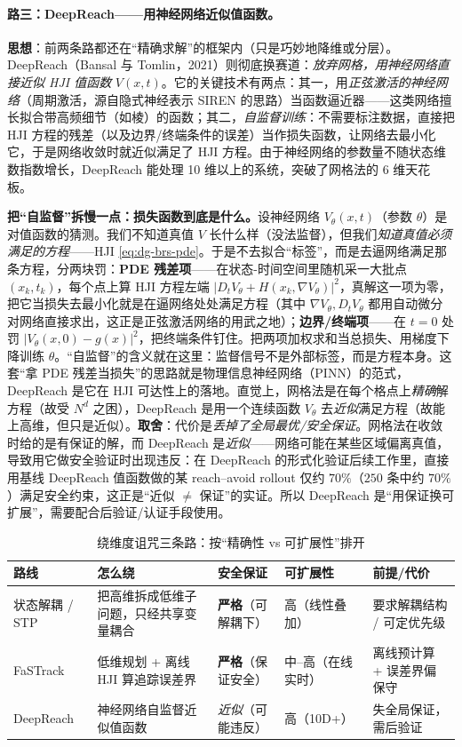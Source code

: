 \paragraph{路三：DeepReach——用神经网络近似值函数。}
\textbf{思想}：前两条路都还在“精确求解”的框架内（只是巧妙地降维或分层）。DeepReach（Bansal 与 Tomlin，2021）则彻底换赛道：\emph{放弃网格，用神经网络直接近似 HJI 值函数} $V(x,t)$\cite{bansal2021deepreach}。它的关键技术有两点：其一，用\emph{正弦激活的神经网络}（周期激活，源自隐式神经表示 SIREN 的思路）当函数逼近器——这类网络擅长拟合带高频细节（如棱）的函数；其二，\emph{自监督训练}：不需要标注数据，直接把 HJI 方程的残差（以及边界/终端条件的误差）当作损失函数，让网络去最小化它，于是网络收敛时就近似满足了 HJI 方程。由于神经网络的参数量不随状态维数指数增长，DeepReach 能处理 10 维以上的系统，突破了网格法的 6 维天花板。

\textbf{把“自监督”拆慢一点：损失函数到底是什么。}\;设神经网络 $V_\theta(x,t)$（参数 $\theta$）是对值函数的猜测。我们不知道真值 $V$ 长什么样（没法监督），但我们\emph{知道真值必须满足的方程}——HJI \cref{eq:dg-brs-pde}。于是不去拟合“标签”，而是去逼网络满足那条方程，分两块罚：\textbf{PDE 残差项}——在状态-时间空间里随机采一大批点 $(x_k,t_k)$，每个点上算 HJI 方程左端 $|D_t V_\theta+H(x_k,\nabla V_\theta)|^2$，真解这一项为零，把它当损失去最小化就是在逼网络处处满足方程（其中 $\nabla V_\theta,D_t V_\theta$ 都用自动微分对网络直接求出，这正是正弦激活网络的用武之地）；\textbf{边界/终端项}——在 $t=0$ 处罚 $|V_\theta(x,0)-g(x)|^2$，把终端条件钉住。把两项加权求和当总损失、用梯度下降训练 $\theta$。“自监督”的含义就在这里：监督信号不是外部标签，而是方程本身。这套“拿 PDE 残差当损失”的思路就是物理信息神经网络（PINN）的范式，DeepReach 是它在 HJI 可达性上的落地。直觉上，网格法是在每个格点上\emph{精确}解方程（故受 $N^d$ 之困），DeepReach 是用一个连续函数 $V_\theta$ 去\emph{近似}满足方程（故能上高维，但只是近似）。\textbf{取舍}：代价是\emph{丢掉了全局最优/安全保证}。网格法在收敛时给的是有保证的解，而 DeepReach 是\emph{近似}——网络可能在某些区域偏离真值，导致用它做安全验证时出现违反：在 DeepReach 的形式化验证后续工作\cite{lin2023generating}里，直接用基线 DeepReach 值函数做的某 reach--avoid rollout 仅约 $70\%$（$250$ 条中约 $70\%$）满足安全约束，这正是“近似 $\ne$ 保证”的实证。所以 DeepReach 是“用保证换可扩展”，需要配合后验证/认证手段使用。

\begin{table}[H]\centering\small
\caption{绕维度诅咒三条路：按“精确性 vs 可扩展性”排开}
\label{tab:dg-detour}
\begin{tabular}{p{} p{} p{} p{} p{}}
\toprule
路线 & 怎么绕 & 安全保证 & 可扩展性 & 前提/代价 \\
\midrule
状态解耦 / STP & 把高维拆成低维子问题，只经共享变量耦合 & \textbf{严格}（可解耦下） & 高（线性叠加） & 要求解耦结构 / 可定优先级 \\
FaSTrack & 低维规划 + 离线 HJI 算追踪误差界 & \textbf{严格}（保证安全） & 中--高（在线实时） & 离线预计算 + 误差界偏保守 \\
DeepReach & 神经网络自监督近似值函数 & \emph{近似}（可能违反） & 高（10D+） & 失全局保证，需后验证 \\
\bottomrule
\end{tabular}
\end{table}

